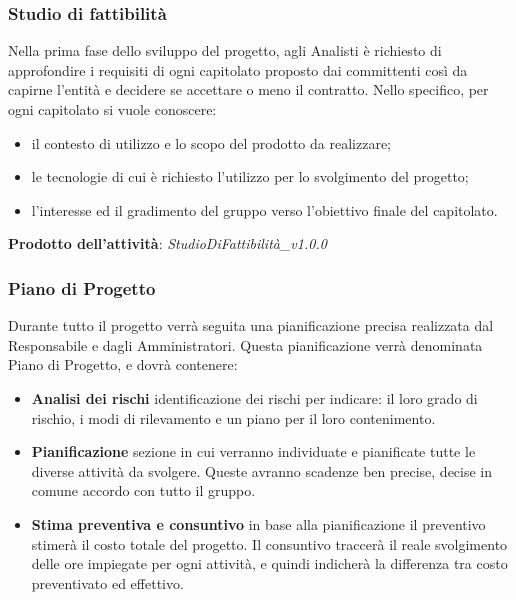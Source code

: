 \documentclass[11pt,a4paper]{article}
\begin{document}
{	\subsubsection{Studio di fattibilità}
	Nella prima fase dello sviluppo del progetto, agli Analisti è richiesto di approfondire i requisiti di ogni capitolato proposto dai committenti così da capirne l'entità e decidere se accettare o meno il contratto. Nello specifico, per ogni capitolato si vuole conoscere:
	\begin{itemize}
		\item il contesto di utilizzo e lo scopo del prodotto da realizzare;
		\item le tecnologie di cui è richiesto l'utilizzo per lo svolgimento del progetto;
		\item l'interesse ed il gradimento del gruppo verso l'obiettivo finale del capitolato.
	\end{itemize}
	\textbf{Prodotto dell'attività}: \textit{StudioDiFattibilità\_v1.0.0}
	
	\subsubsection{Piano di Progetto}
	Durante tutto il progetto verrà seguita una pianificazione precisa realizzata dal Responsabile e dagli Amministratori.
	Questa pianificazione verrà denominata Piano di Progetto, e dovrà contenere:
	\begin{itemize}
		\item \textbf{Analisi dei rischi} identificazione dei rischi per indicare: il loro grado di rischio, i modi di rilevamento e un piano per il loro contenimento.
		\item \textbf{Pianificazione} sezione in cui verranno individuate e pianificate tutte le diverse attività da svolgere. 
		Queste avranno scadenze ben precise, decise in comune accordo con tutto il gruppo.
		\item \textbf{Stima preventiva e consuntivo} in base alla pianificazione il preventivo stimerà il costo totale del progetto. Il consuntivo traccerà il reale svolgimento delle ore impiegate per ogni attività, e quindi indicherà la differenza tra costo preventivato ed effettivo. 
	\end{itemize}

}
\end{document}

